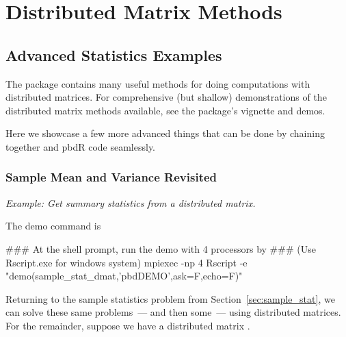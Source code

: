 \part{Distributed Matrix Methods}
\label{part:dmat}


\chapter{Advanced Statistics Examples}

The  package contains many useful methods for doing computations with distributed matrices.  For comprehensive (but shallow) demonstrations of the distributed matrix methods available, see the  package's vignette and demos.

Here we showcase a few more advanced things that can be done by chaining together  and pbdR code seamlessly.





\section{Sample Mean and Variance Revisited}

\emph{Example:  Get summary statistics from a distributed matrix.}

The demo command is
\begin{Command}
### At the shell prompt, run the demo with 4 processors by
### (Use Rscript.exe for windows system)
mpiexec -np 4 Rscript -e "demo(sample_stat_dmat,'pbdDEMO',ask=F,echo=F)"
\end{Command}

Returning to the sample statistics problem from Section~\ref{sec:sample_stat}, we can solve these same problems~--- and then some~--- using distributed matrices.  For the remainder, suppose we have a distributed matrix .


